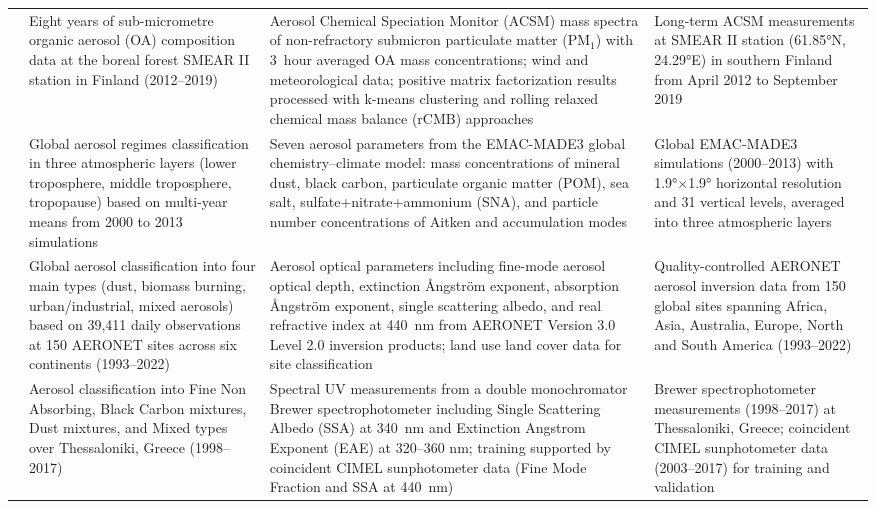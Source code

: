 \documentclass[11pt]{article}
\begin{document}
\begin{landscape}
\begin{longtable}{>{\raggedright\arraybackslash}p{2cm} 
        >{\raggedright\arraybackslash}p{4cm} 
        >{\raggedright\arraybackslash}p{10cm} 
        >{\raggedright\arraybackslash}p{6cm}}
\citet{heikkinen2021eight} & Eight years of sub-micrometre organic aerosol (OA) composition data at the boreal forest SMEAR II station in Finland (2012–2019) & Aerosol Chemical Speciation Monitor (ACSM) mass spectra of non-refractory submicron particulate matter (PM$_{1}$) with 3~hour averaged OA mass concentrations; wind and meteorological data; positive matrix factorization results processed with k-means clustering and rolling relaxed chemical mass balance (rCMB) approaches & Long-term ACSM measurements at SMEAR II station (61.85°N, 24.29°E) in southern Finland from April 2012 to September 2019 \\[6pt]

\citet{li2022aerosol} & Global aerosol regimes classification in three atmospheric layers (lower troposphere, middle troposphere, tropopause) based on multi-year means from 2000 to 2013 simulations & Seven aerosol parameters from the EMAC-MADE3 global chemistry–climate model: mass concentrations of mineral dust, black carbon, particulate organic matter (POM), sea salt, sulfate+nitrate+ammonium (SNA), and particle number concentrations of Aitken and accumulation modes & Global EMAC-MADE3 simulations (2000–2013) with 1.9°$\times$1.9° horizontal resolution and 31 vertical levels, averaged into three atmospheric layers \\[6pt]

\citet{ningombam2024aerosol} & Global aerosol classification into four main types (dust, biomass burning, urban/industrial, mixed aerosols) based on 39,411 daily observations at 150 AERONET sites across six continents (1993–2022) & Aerosol optical parameters including fine-mode aerosol optical depth, extinction Ångström exponent, absorption Ångström exponent, single scattering albedo, and real refractive index at 440~nm from AERONET Version 3.0 Level 2.0 inversion products; land use land cover data for site classification & Quality-controlled AERONET aerosol inversion data from 150 global sites spanning Africa, Asia, Australia, Europe, North and South America (1993–2022) \\[6pt]

\citet{siomos2020automated} & Aerosol classification into Fine Non Absorbing, Black Carbon mixtures, Dust mixtures, and Mixed types over Thessaloniki, Greece (1998–2017) & Spectral UV measurements from a double monochromator Brewer spectrophotometer including Single Scattering Albedo (SSA) at 340~nm and Extinction Angstrom Exponent (EAE) at 320–360 nm; training supported by coincident CIMEL sunphotometer data (Fine Mode Fraction and SSA at 440~nm) & Brewer spectrophotometer measurements (1998–2017) at Thessaloniki, Greece; coincident CIMEL sunphotometer data (2003–2017) for training and validation \\[6pt]


\end{longtable}
\end{landscape}
\end{document}
